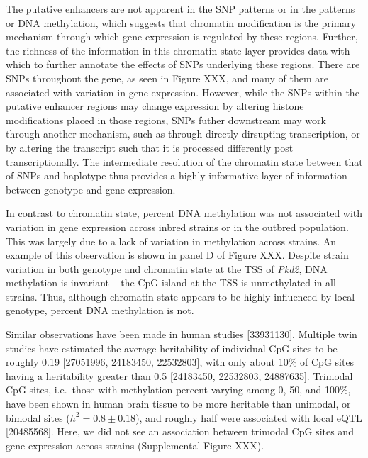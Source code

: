 \documentclass[10pt,letterpaper]{article}
\begin{document}
The putative enhancers are not apparent in the SNP patterns or in the
patterns or DNA methylation, which suggests that chromatin modification
is the primary mechanism through which gene expression is regulated by
these regions. Further, the richness of the information in this
chromatin state layer provides data with which to further annotate the
effects of SNPs underlying these regions. There are SNPs throughout the
gene, as seen in Figure XXX, and many of them are associated with
variation in gene expression. However, while the SNPs within the
putative enhancer regions may change expression by altering histone
modifications placed in those regions, SNPs futher downstream may work
through another mechanism, such as through directly dirsupting
transcription, or by altering the transcript such that it is processed
differently post transcriptionally. The intermediate resolution of the
chromatin state between that of SNPs and haplotype thus provides a
highly informative layer of information between genotype and gene
expression.

In contrast to chromatin state, percent DNA methylation was not
associated with variation in gene expression across inbred strains or in
the outbred population. This was largely due to a lack of variation in
methylation across strains. An example of this observation is shown in
panel D of Figure XXX. Despite strain variation in both genotype and
chromatin state at the TSS of \textit{Pkd2}, DNA methylation is
invariant -- the CpG island at the TSS is unmethylated in all strains.
Thus, although chromatin state appears to be highly influenced by local
genotype, percent DNA methylation is not.

Similar observations have been made in human studies {[}33931130{]}.
Multiple twin studies have estimated the average heritability of
individual CpG sites to be roughly 0.19 {[}27051996, 24183450,
22532803{]}, with only about 10\% of CpG sites having a heritability
greater than 0.5 {[}24183450, 22532803, 24887635{]}. Trimodal CpG sites,
i.e.~those with methylation percent varying among 0, 50, and 100\%, have
been shown in human brain tissue to be more heritable than unimodal, or
bimodal sites (\(h^2 = 0.8 \pm 0.18\)), and roughly half were associated
with local eQTL {[}20485568{]}. Here, we did not see an association
between trimodal CpG sites and gene expression across strains
(Supplemental Figure XXX).
\end{document}
